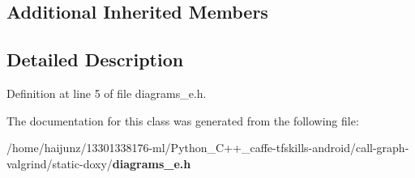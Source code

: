 \subsection*{Additional Inherited Members}


\subsection{Detailed Description}


Definition at line 5 of file diagrams\-\_\-e.\-h.



The documentation for this class was generated from the following file\-:\begin{DoxyCompactItemize}
\item 
/home/haijunz/13301338176-\/ml/\-Python\-\_\-\-C++\-\_\-caffe-\/tfskills-\/android/call-\/graph-\/valgrind/static-\/doxy/{\bf diagrams\-\_\-e.\-h}\end{DoxyCompactItemize}
